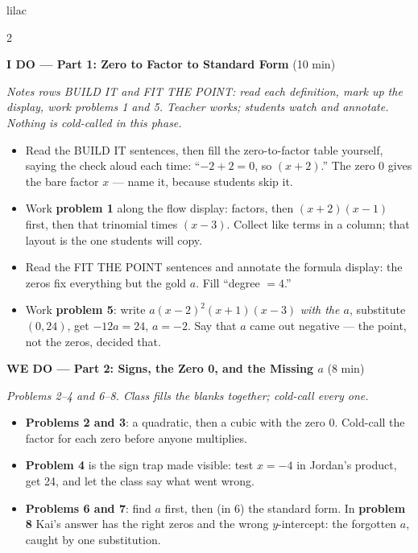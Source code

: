 \documentclass[10pt]{article}
\begin{document}
\begin{skillbox}{lilac}
\raggedcolumns
\begin{multicols}{2}

\textbf{I DO --- Part 1: Zero to Factor to Standard Form} (10 min)

\textit{Notes rows BUILD IT and FIT THE POINT: read each definition, mark up the display, work
problems 1 and 5. Teacher works; students watch and annotate. Nothing is cold-called in this
phase.}
\begin{itemize}
  \item Read the BUILD IT sentences, then fill the zero-to-factor table yourself, saying the
        check aloud each time: ``$-2 + 2 = 0$, so $(x + 2)$.'' The zero $0$ gives the bare
        factor $x$ --- name it, because students skip it.
  \item Work \textbf{problem 1} along the flow display: factors, then $(x + 2)(x - 1)$ first,
        then that trinomial times $(x - 3)$. Collect like terms in a column; that layout is
        the one students will copy.
  \item Read the FIT THE POINT sentences and annotate the formula display: the zeros fix
        everything but the gold $a$. Fill ``degree $= 4$.''
  \item Work \textbf{problem 5}: write $a(x - 2)^2(x + 1)(x - 3)$ \emph{with the $a$}, substitute
        $(0, 24)$, get $-12a = 24$, $a = -2$. Say that $a$ came out negative --- the point,
        not the zeros, decided that.
\end{itemize}

\textbf{WE DO --- Part 2: Signs, the Zero 0, and the Missing $a$} (8 min)

\textit{Problems 2--4 and 6--8. Class fills the blanks together; cold-call every one.}
\begin{itemize}
  \item \textbf{Problems 2 and 3}: a quadratic, then a cubic with the zero $0$. Cold-call the
        factor for each zero before anyone multiplies.
  \item \textbf{Problem 4} is the sign trap made visible: test $x = -4$ in Jordan's product,
        get 24, and let the class say what went wrong.
  \item \textbf{Problems 6 and 7}: find $a$ first, then (in 6) the standard form. In
        \textbf{problem 8} Kai's answer has the right zeros and the wrong $y$-intercept: the
        forgotten $a$, caught by one substitution.
\end{itemize}


\end{multicols}
\end{skillbox}
\end{document}
